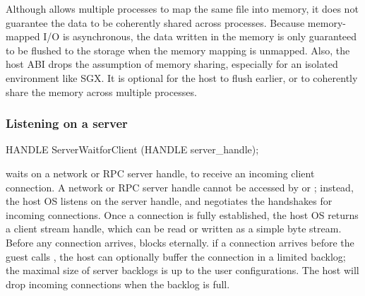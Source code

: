 

Although  allows multiple processes to map the same file into memory, it does not guarantee the data to be coherently shared across processes.
Because memory-mapped I/O is asynchronous,
the data written in the memory is only guaranteed to be flushed to the storage
when the memory mapping is unmapped.
Also, the host ABI drops the assumption of memory sharing, especially for an isolated environment like SGX.
It is optional for the host to flush earlier,
or to coherently share the memory across multiple processes.













\subsubsection*{Listening on a server}


\begin{paldef}
HANDLE ServerWaitforClient (HANDLE server_handle);
\end{paldef} 


 waits on a network or RPC server handle, %
to receive an incoming client connection.
A network or RPC server handle cannot be accessed by  or ;
instead, the host OS listens on the server handle,
and negotiates the handshakes for incoming connections.
Once a connection is fully established,
the host OS returns a client stream handle, which can be read or written as a simple byte stream.
Before any connection arrives,  blocks eternally.
if a connection arrives before the guest calls ,
the host can optionally buffer the connection in a limited backlog; the maximal size of server backlogs is up to the user configurations. The host will drop incoming connections when the backlog is full.




